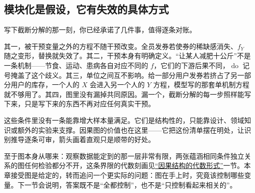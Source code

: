 \subsection{模块化是假设，它有失效的具体方式}

写下截断分解的那一刻，你已经承诺了几件事，值得逐条对账。

其一，被干预变量之外的方程不随干预改变。全员发券若使券的稀缺感消失、\(f_Y\) 随之变形，替换就失效了。其二，干预本身有明确定义。``让某人减肥十公斤''不是一条机制——节食、运动、患病各自对应不同的 \(f\)，它们的下游后果不同，\(\operatorname{do}\) 记号掩盖了这个歧义。其三，单位之间互不影响。给一部分用户发券若挤占了另一部分用户的库存，一个人的 \(X\) 会进入另一个人的 \(Y\) 方程，模型写的那套单机制方程就不够用了。其四，图里没有漏掉共同原因。漏一个，截断分解的每一步照样能写下来，只是写下来的东西不再对应任何真实干预。

这些条件里没有一条能靠增大样本量满足。它们是结构性的，只能靠设计、领域知识或额外的实验来支撑。因果图的价值也在这里——它把这份清单摆在明处，让识别推导逐条可审，箭头画着直观只是顺带的好处。

至于图本身从哪来：观察数据能定到的那一层非常有限，两张蕴涵相同条件独立关系的图任何检验都分不开，这条界限的代数刻画见\hyperref[sec:12-Real-Analysis-Support/10-Essential-Structures/04]{``因果结构的代数形式''}一节。本章接受图是给定的，转而追问一个更实际的问题：图在手上时，究竟该控制哪些变量。下一节会说明，答案既不是``全都控制''，也不是``只控制看起来相关的''。
